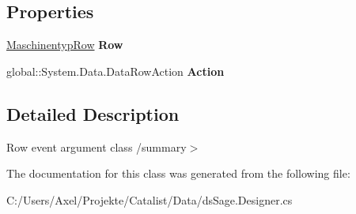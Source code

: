 \subsection*{Properties}
\begin{DoxyCompactItemize}
\item 
\hyperlink{class_products_1_1_data_1_1ds_sage_1_1_maschinentyp_row}{Maschinentyp\+Row} {\bfseries Row}\hypertarget{class_products_1_1_data_1_1ds_sage_1_1_maschinentyp_row_change_event_a06ba2ca7a7c36e73420fc88fbc883039}{}\label{class_products_1_1_data_1_1ds_sage_1_1_maschinentyp_row_change_event_a06ba2ca7a7c36e73420fc88fbc883039}

\item 
global\+::\+System.\+Data.\+Data\+Row\+Action {\bfseries Action}\hypertarget{class_products_1_1_data_1_1ds_sage_1_1_maschinentyp_row_change_event_a53e3387710c1c1982a7fdd9446727ec2}{}\label{class_products_1_1_data_1_1ds_sage_1_1_maschinentyp_row_change_event_a53e3387710c1c1982a7fdd9446727ec2}

\end{DoxyCompactItemize}


\subsection{Detailed Description}
Row event argument class /summary$>$ 

The documentation for this class was generated from the following file\+:\begin{DoxyCompactItemize}
\item 
C\+:/\+Users/\+Axel/\+Projekte/\+Catalist/\+Data/ds\+Sage.\+Designer.\+cs\end{DoxyCompactItemize}
